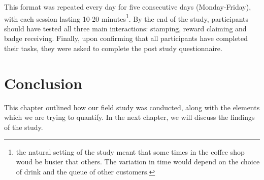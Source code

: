 This format was repeated every day for five consecutive days (Monday-Friday), with each session lasting 10-20 minutes\footnote{the natural setting of the study meant that some times in the coffee shop woud be busier that others. The variation in time would depend on the choice of drink and the queue of other customers.}. By the end of the study, participants should have tested all three main interactions: stamping, reward claiming and badge receiving. Finally, upon confirming that all participants have completed their tasks, they were asked to complete the post study questionnaire.

\section{Conclusion}
This chapter outlined how our field study was conducted, along with the elements which we are trying to quantify. In the next chapter, we will discuss the findings of the study.
